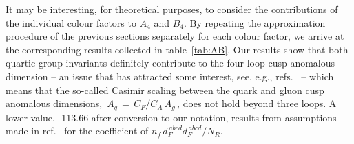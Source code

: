 \documentclass[12pt]{article}
\def\ca{{C^{}_A}}
\def\cf{{C^{}_F}}
\def\nf{{n^{}_{\! f}}}
\begin{document}
\pagebreak

It may be interesting, for theoretical purposes, to consider the contributions
of the individual colour factors to $A_4$ and $B_4$. By repeating the 
approximation procedure of the previous sections separately for each colour 
factor, we arrive at the corresponding results collected in table~\ref{tab:AB}. 
Our results show that both quartic group invariants definitely contribute to 
the four-loop cusp anomalous dimension -- an issue that has attracted some 
interest, see, e.g., 
refs.~\cite{Gardi:2009qi,Becher:2009qa,Gardi:2009zv,Ahrens:2012qz,Boels:2017skl} 
-- which means that the so-called Casimir scaling between the quark and gluon 
cusp anomalous dimensions, $\,A_q \,=\, \cf/\ca\, A_g\,$, does not hold beyond 
three loops. A lower value, -113.66 after conversion to our notation, results
from assumptions made in ref.~\cite{Grozin:2015kna} for the coefficient of 
$\nf\,d_F^{\,abcd}d_F^{\,abcd}/N_R$.
\end{document}

